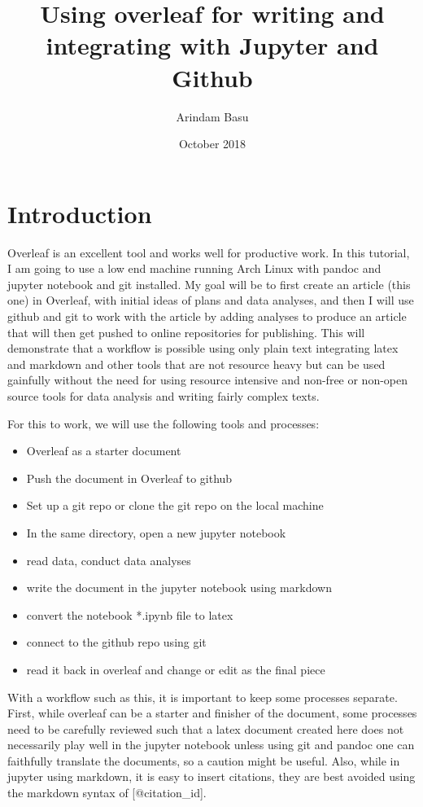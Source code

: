 \documentclass{article}
\title{Using overleaf for writing and integrating with Jupyter and Github}
\author{Arindam Basu}
\date{October 2018}
\begin{document}
\maketitle

\section*{Introduction}
Overleaf is an excellent tool and works well for productive work. In this tutorial, I am going to use a low end machine running Arch Linux with pandoc and jupyter notebook and git installed. My goal will be to first create an article (this one) in Overleaf, with initial ideas of plans and data analyses, and then I will use github and git to work with the article by adding analyses to produce an article that will then get pushed to online repositories for publishing. This will demonstrate that a workflow is possible using only plain text integrating latex and markdown and other tools that are not resource heavy but can be used gainfully without the need for using resource intensive and non-free or non-open source tools for data analysis and writing fairly complex texts. 

For this to work, we will use the following tools and processes:

\begin{itemize}
    \item Overleaf as a starter document
    \item Push the document in Overleaf to github
    \item Set up a git repo or clone the git repo on the local machine
    \item In the same directory, open a new jupyter notebook
    \item read data, conduct data analyses
    \item write the document in the jupyter notebook using markdown
    \item convert the notebook *.ipynb file to latex
    \item connect to the github repo using git
    \item read it back in overleaf and change or edit as the final piece

\end{itemize}

With a workflow such as this, it is important to keep some processes separate. First, while overleaf can be a starter and finisher of the document, some processes need to be carefully reviewed such that a latex document created here does not necessarily play well in the jupyter notebook unless using git and pandoc one can faithfully translate the documents, so a caution might be useful. Also, while in jupyter using markdown, it is easy to insert citations, they are best avoided using the markdown syntax of [@citation\_id].
\end{document}
